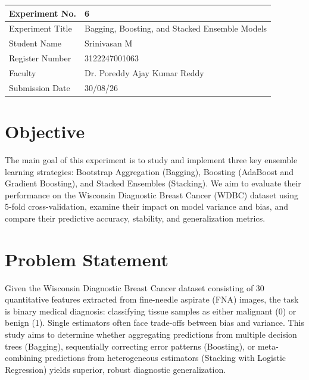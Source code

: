 \documentclass[12pt,a4paper]{article}
\begin{document}
\begin{tabular}{|p{4cm}|p{11cm}|}
\hline
Experiment No. & 6 \\ \hline
Experiment Title & Bagging, Boosting, and Stacked Ensemble Models \\ \hline
Student Name & Srinivasan M \\ \hline
Register Number & 3122247001063 \\ \hline
Faculty & Dr. Poreddy Ajay Kumar Reddy \\ \hline
Submission Date & 30/08/26 \\ \hline
\end{tabular}

\section{Objective}
The main goal of this experiment is to study and implement three key ensemble learning strategies: Bootstrap Aggregation (Bagging), Boosting (AdaBoost and Gradient Boosting), and Stacked Ensembles (Stacking). We aim to evaluate their performance on the Wisconsin Diagnostic Breast Cancer (WDBC) dataset using 5-fold cross-validation, examine their impact on model variance and bias, and compare their predictive accuracy, stability, and generalization metrics.

\section{Problem Statement}
Given the Wisconsin Diagnostic Breast Cancer dataset consisting of 30 quantitative features extracted from fine-needle aspirate (FNA) images, the task is binary medical diagnosis: classifying tissue samples as either malignant (0) or benign (1). Single estimators often face trade-offs between bias and variance. This study aims to determine whether aggregating predictions from multiple decision trees (Bagging), sequentially correcting error patterns (Boosting), or meta-combining predictions from heterogeneous estimators (Stacking with Logistic Regression) yields superior, robust diagnostic generalization.
\end{document}
